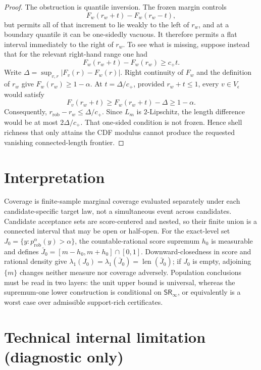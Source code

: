 \documentclass{article}
\begin{document}
\begin{proof}
The obstruction is quantile inversion. The frozen margin controls
\[
F_w(r_w+t)-F_w(r_w-t),
\]
but permits all of that increment to lie weakly to the left of \(r_w\), and at a boundary quantile it can be one-sidedly vacuous. It therefore permits a flat interval immediately to the right of \(r_w\). To see what is missing, suppose instead that for the relevant right-hand range one had
\[
F_w(r_w+t)-F_w(r_w)\ge c_+t.
\]
Write \(\Delta=\sup_{v,r}|F_v(r)-F_w(r)|\). Right continuity of \(F_w\) and the definition of \(r_w\) give \(F_w(r_w)\ge1-\alpha\). At \(t=\Delta/c_+\), provided \(r_w+t\le1\), every \(v\in V_\epsilon\) would satisfy
\[
F_v(r_w+t)\ge F_w(r_w+t)-\Delta\ge1-\alpha.
\]
Consequently, \(r_{\mathrm{rob}}-r_w\le\Delta/c_+\). Since \(L_m\) is \(2\)-Lipschitz, the length difference would be at most \(2\Delta/c_+\). That one-sided condition is not frozen. Hence shell richness that only attains the CDF modulus cannot produce the requested vanishing connected-length frontier.
\end{proof}

\section{Interpretation}

Coverage is finite-sample marginal coverage evaluated separately under each candidate-specific target law, not a simultaneous event across candidates. Candidate acceptance sets are score-centered and nested, so their finite union is a connected interval that may be open or half-open. For the exact-level set \(J_0=\{y:p_{\mathrm{rob}}^\alpha(y)>\alpha\}\), the countable-rational score supremum \(h_0\) is measurable and defines \(\bar J_0=[m-h_0,m+h_0]\cap[0,1]\). Downward-closedness in score and rational density give \(\lambda_1(J_0)=\lambda_1(\bar J_0)=\operatorname{len}(\bar J_0)\); if \(J_0\) is empty, adjoining \(\{m\}\) changes neither measure nor coverage adversely. Population conclusions must be read in two layers: the unit upper bound is universal, whereas the supremum-one lower construction is conditional on \(\mathsf{SR}_\infty\), or equivalently is a worst case over admissible support-rich certificates.

\section*{Technical internal limitation (diagnostic only)}
\end{document}
